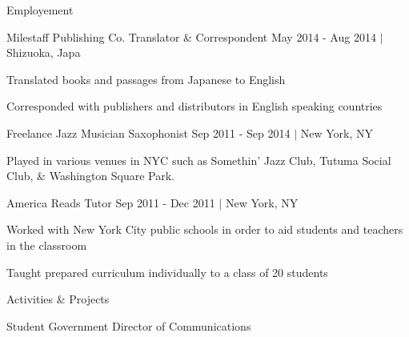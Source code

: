 \documentclass {vangogh500-resume}
\begin{document}
\begin{minipage}[t]{0.02\textwidth}
\hfill
\end {minipage}%
\begin{minipage}[t]{0.64\textwidth}
	\begin {newcategory} {Employement}
		\begin {job} {Milestaff Publishing Co.} {Translator \& Correspondent}
			May 2014 - Aug 2014 $|$ Shizuoka, Japa
			\begin{tightbullets}
				\item Translated books and passages from Japanese to English
				\item Corresponded with publishers and distributors in English speaking countries
			\end{tightbullets}
		\end {job}
		\begin {job} {Freelance Jazz Musician} {Saxophonist}
			Sep 2011 - Sep 2014 $|$ New York, NY
			\begin{tightbullets}
				\item Played in various venues in NYC such as Somethin' Jazz Club, Tutuma Social Club, \& Washington Square Park.
			\end{tightbullets}
		\end {job}
		\begin {job} {America Reads} {Tutor}
			Sep 2011 - Dec 2011 $|$ New York, NY
			\begin{tightbullets}
				\item Worked with New York City public schools in order to aid students and teachers in the classroom
				\item Taught prepared curriculum individually to a class of 20 students
			\end{tightbullets}
		\end {job}
	\vspace{10pt}
	\end {newcategory}
	\begin {newcategory} {Activities \& Projects}
		\begin{job} {Student Government} {Director of Communications}

\end{job}
\end{newcategory}
\end{minipage}
\end{document}
